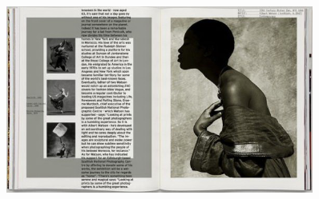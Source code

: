\begin{figure}[htbp]
\includegraphics[width=0.9\textwidth]{artbook}
\end{figure}

%

\def\asidecaption{\parbox{4.2cm}{{\bfseries Image \thefigure}\par\lorem}%
}
\def\ps@caption{%
     \let\@oddfoot\@empty\let\@evenfoot\@empty%
    \def\@evenhead{%
        \begin{picture}(0,0)%
           \put(-150,-80){\asidecaption\par}%
            \stepcounter{figure}
           \put(-150,-370){\asidecaption}%
        \end{picture}%
      }%
    \let\@oddhead\@evenhead%
    \let\@mkboth\@gobbletwo%
    \let\chaptermark\@gobble%
    \let\sectionmark\@gobble%
 }

